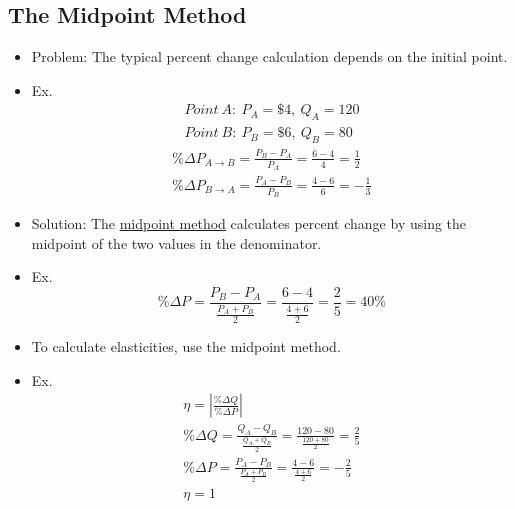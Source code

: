 \subsection{The Midpoint Method}

\begin{itemize}

	\item Problem: The typical percent change calculation depends on the initial point.
	
	\item Ex.
		\begin{gather*}
		Point \ A: \ P_A = \$4, \ Q_A = 120 \\
		Point \ B: \ P_B = \$6, \ Q_B = 80
		\end{gather*}
		\begin{gather*}
		\% \Delta P_{A \rightarrow B} = \frac{P_B - P_A}{P_A} = \frac{6 - 4}{4} = \frac{1}{2} \\
		\% \Delta P_{B \rightarrow A} = \frac{P_A - P_B}{P_B} = \frac{4 - 6}{6} = -\frac{1}{3}
		\end{gather*}
	
	\item Solution: The \underline{midpoint method} calculates percent change by using the midpoint of the two values in the denominator. 
	
	\item Ex. \[ \% \Delta P = \frac{P_B - P_A}{\frac{P_A + P_B}{2}} = \frac{6 - 4}{\frac{4 + 6}{2}}  = \frac{2}{5} = 40\% \]
	
	\item To calculate elasticities, use the midpoint method.
	
	\item Ex. 
	\begin{gather*}
	\eta = \left| \frac{\% \Delta Q}{\% \Delta P} \right| \\
	\% \Delta Q = \frac{Q_A - Q_B}{\frac{Q_A + Q_B}{2}} = \frac{120 - 80}{\frac{120 + 80}{2}} = \frac{2}{5} \\
	\% \Delta P = \frac{P_A - P_B}{\frac{P_A + P_B}{2}} = \frac{4 - 6}{\frac{4 + 6}{2}} = -\frac{2}{5} \\
	\eta = 1
	\end{gather*}
		
\end{itemize}